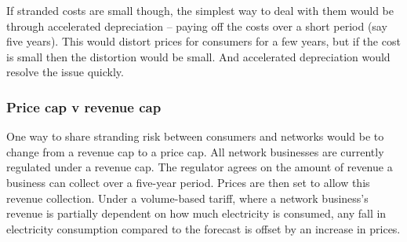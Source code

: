 \documentclass[FrontPage]{grattan}
\begin{document}
If stranded costs are small though, the simplest way to deal with them would be through accelerated depreciation -- paying off the costs over a short period (say five years). This would distort prices for consumers for a few years, but if the cost is small then the distortion would be small. And accelerated depreciation would resolve the issue quickly.





\subsubsection{Price cap v revenue cap}
One way to share stranding risk between consumers and networks would be to change from a revenue cap to a price cap. All network businesses are currently regulated under a revenue cap. The regulator agrees on the amount of revenue a business can collect over a five-year period. Prices are then set to allow this revenue collection. Under a volume-based tariff, where a network business's revenue is partially dependent on how much electricity is consumed, any fall in electricity consumption compared to the forecast is offset by an increase in prices.
\end{document}
